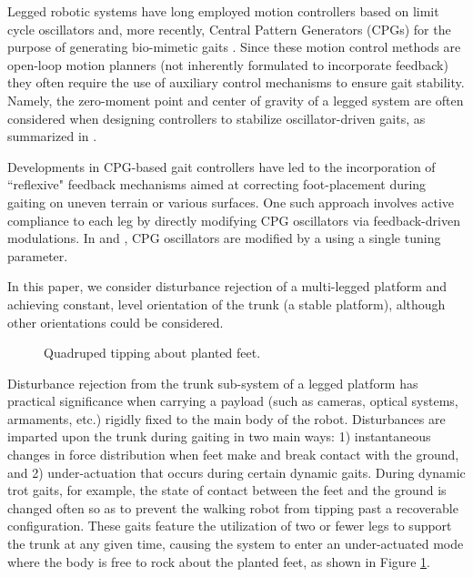 
Legged robotic systems have long employed motion controllers based on limit cycle oscillators and, more recently, Central Pattern Generators (CPGs)  for the purpose of generating bio-mimetic gaits \cite{Matsuoka1985,Collins1993,Endo2004,Righetti2006,Ijspeert2008,Matos2010,Ajallooeian2013,Park2014,Fukuoka2015}. Since these motion control methods are open-loop motion planners (\IE not inherently formulated to incorporate feedback) they often require the use of auxiliary control mechanisms to ensure gait stability. Namely, the zero-moment point and center of gravity of a legged system are often considered when designing controllers to stabilize oscillator-driven gaits, as summarized in \cite{Wieber2015}. %

Developments in CPG-based gait controllers have led to the incorporation of ``reflexive" feedback mechanisms aimed at correcting foot-placement during gaiting on uneven terrain or various surfaces. One such approach involves active compliance to each leg by directly modifying CPG oscillators via feedback-driven modulations. In \cite{Endo2004} and \cite{Fukuoka2003}, CPG oscillators are modified by a using a single tuning parameter.

In this paper, we consider disturbance rejection of a multi-legged platform and achieving constant, level orientation of the trunk (\IE a stable platform), although other orientations could be considered. 
	\begin{figure}[t!]
		\vspace{2mm}
		\centering
		\caption{ Quadruped tipping about planted feet.}
		\label{fig::quadruped_walking}
		\vspace{-7mm}
	\end{figure}
Disturbance rejection from the trunk sub-system of a legged platform has practical significance when carrying a payload (such as cameras, optical systems, armaments, etc.) rigidly fixed to the main body of the robot. Disturbances are imparted upon the trunk during gaiting in two main ways: 1) instantaneous changes in force distribution when feet make and break contact with the ground, and 2) under-actuation that occurs during certain dynamic gaits. During dynamic trot gaits, for example, the state of contact between the feet and the ground is changed often so as to prevent the walking robot from tipping past a recoverable configuration. These gaits feature the utilization of two or fewer legs to support the trunk at any given time, causing the system to enter an under-actuated mode where the body is free to rock about the planted feet, as shown in Figure \ref{fig::quadruped_walking}.

